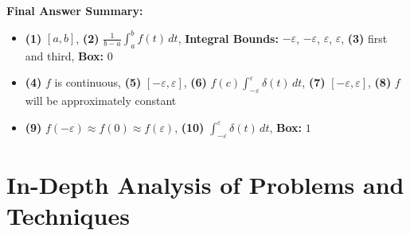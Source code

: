 \documentclass[11pt, letterpaper]{article}
\theoremstyle{definition}
\theoremstyle{remark}
\begin{document}
\textbf{Final Answer Summary:}
\begin{itemize}
    \item \textbf{(1)} $[a, b]$, \quad \textbf{(2)} $\frac{1}{b - a}\int_{a}^{b} f(t)\,dt$, \quad \textbf{Integral Bounds:} $-\varepsilon$, $-\varepsilon$, $\varepsilon$, $\varepsilon$, \quad \textbf{(3)} first and third, \quad \textbf{Box:} $0$
    \item \textbf{(4)} $f$ is continuous, \quad \textbf{(5)} $[-\varepsilon, \varepsilon]$, \quad \textbf{(6)} $f(c)\int_{-\varepsilon}^{\varepsilon} \delta(t)\,dt$, \quad \textbf{(7)} $[-\varepsilon, \varepsilon]$, \quad \textbf{(8)} $f$ will be approximately constant
    \item \textbf{(9)} $f(-\varepsilon) \approx f(0) \approx f(\varepsilon)$, \quad \textbf{(10)} $\int_{-\varepsilon}^{\varepsilon} \delta(t)\,dt$, \quad \textbf{Box:} $1$
\end{itemize}

\newpage

\section{In-Depth Analysis of Problems and Techniques}
\end{document}
